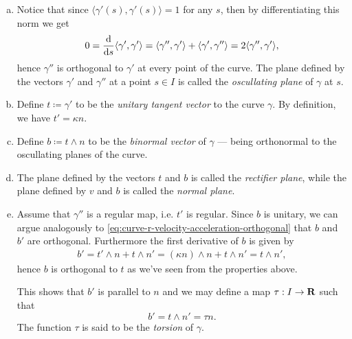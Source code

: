 \begin{definition}
\begin{enumerate}[(a)]
        \item Notice that since \(\langle \gamma'(s), \gamma'(s) \rangle = 1\) for any \(s\), then
            by differentiating this norm we get
            \begin{align}\label{eq:curve-r-velocity-acceleration-orthogonal}
                0 = \frac{\mathrm{d}}{\mathrm{d} s} \langle \gamma', \gamma' \rangle
                = \langle \gamma'', \gamma' \rangle + \langle \gamma', \gamma'' \rangle
                = 2 \langle \gamma'', \gamma' \rangle,
            \end{align}
            hence \(\gamma''\) is orthogonal to \(\gamma'\) at every point of the curve. The plane
            defined by the vectors \(\gamma'\) and \(\gamma''\) at a point \(s \in I\) is called the
            \emph{oscullating plane} of \(\gamma\) at \(s\).

        \item Define \(t \coloneq \gamma'\) to be the \emph{unitary tangent vector} to the curve
            \(\gamma\). By definition, we have \(t' = \kappa n\).
        
        \item Define \(b \coloneq t \wedge n\) to be the \emph{binormal vector} of \(\gamma\) ---
            being orthonormal to the oscullating planes of the curve. 

        \item The plane defined by the vectors \(t\) and \(b\) is called the \emph{rectifier plane},
            while the plane defined by \(v\) and \(b\) is called the \emph{normal plane}.

        \item Assume that \(\gamma''\) is a regular map, i.e. \(t'\) is regular. Since \(b\) is
            unitary, we can argue analogously to \cref{eq:curve-r-velocity-acceleration-orthogonal}
            that \(b\) and \(b'\) are orthogonal. Furthermore the first derivative of \(b\) is given
            by
            \begin{align*}
                b' = t' \wedge n + t \wedge n'
                = (\kappa n) \wedge n + t \wedge n'
                = t \wedge n',
            \end{align*}
            hence \(b\) is orthogonal to \(t\) as we've seen from the properties above.

            This shows that \(b'\) is parallel to \(n\) and we may define a map \(\tau: I \to \mathbf{R}\)
            such that
            \[
                b' = t \wedge n' = \tau n.
            \]
            The function \(\tau\) is said to be the \emph{torsion} of \(\gamma\).


\end{enumerate}
\end{definition}
